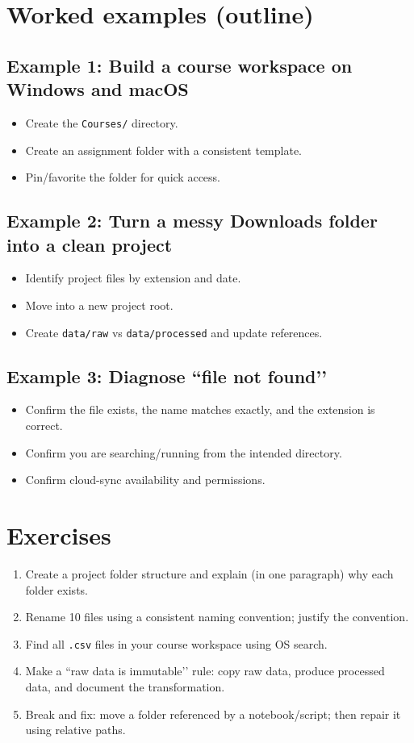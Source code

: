\section{Worked examples (outline)}
\subsection{Example 1: Build a course workspace on Windows and macOS}
\begin{itemize}
\item Create the \texttt{Courses/} directory.
\item Create an assignment folder with a consistent template.
\item Pin/favorite the folder for quick access.
\end{itemize}

\subsection{Example 2: Turn a messy Downloads folder into a clean project}
\begin{itemize}
\item Identify project files by extension and date.
\item Move into a new project root.
\item Create \texttt{data/raw} vs \texttt{data/processed} and update references.
\end{itemize}

\subsection{Example 3: Diagnose ``file not found’’}
\begin{itemize}
\item Confirm the file exists, the name matches exactly, and the extension is correct.
\item Confirm you are searching/running from the intended directory.
\item Confirm cloud-sync availability and permissions.
\end{itemize}

\section{Exercises}
\begin{enumerate}
\item Create a project folder structure and explain (in one paragraph) why each folder exists.
\item Rename 10 files using a consistent naming convention; justify the convention.
\item Find all \texttt{.csv} files in your course workspace using OS search.
\item Make a ``raw data is immutable’’ rule: copy raw data, produce processed data, and document the transformation.
\item Break and fix: move a folder referenced by a notebook/script; then repair it using relative paths.
\end{enumerate}

